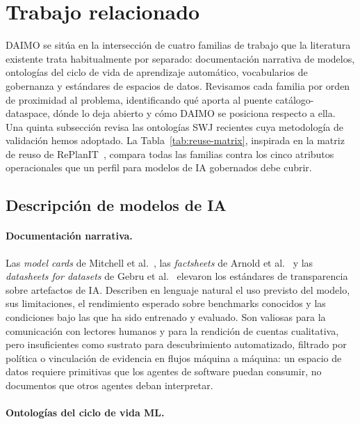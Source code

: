 \documentclass[11pt,a4paper]{article}
\begin{document}
\section{Trabajo relacionado}\label{sec:related}

DAIMO se sitúa en la intersección de cuatro familias de trabajo que la literatura existente trata habitualmente por separado: documentación narrativa de modelos, ontologías del ciclo de vida de aprendizaje automático, vocabularios de gobernanza y estándares de espacios de datos. Revisamos cada familia por orden de proximidad al problema, identificando qué aporta al puente catálogo-dataspace, dónde lo deja abierto y cómo DAIMO se posiciona respecto a ella. Una quinta subsección revisa las ontologías SWJ recientes cuya metodología de validación hemos adoptado. La Tabla~\ref{tab:reuse-matrix}, inspirada en la matriz de reuso de RePlanIT~\cite{kurteva}, compara todas las familias contra los cinco atributos operacionales que un perfil para modelos de IA gobernados debe cubrir.

\subsection{Descripción de modelos de IA}

\paragraph{Documentación narrativa.}

Las \emph{model cards} de Mitchell et al.~\cite{mitchell19}, las \emph{factsheets} de Arnold et al.~\cite{arnold19} y las \emph{datasheets for datasets} de Gebru et al.~\cite{gebru21} elevaron los estándares de transparencia sobre artefactos de IA. Describen en lenguaje natural el uso previsto del modelo, sus limitaciones, el rendimiento esperado sobre benchmarks conocidos y las condiciones bajo las que ha sido entrenado y evaluado. Son valiosas para la comunicación con lectores humanos y para la rendición de cuentas cualitativa, pero insuficientes como sustrato para descubrimiento automatizado, filtrado por política o vinculación de evidencia en flujos máquina a máquina: un espacio de datos requiere primitivas que los agentes de software puedan consumir, no documentos que otros agentes deban interpretar.

\paragraph{Ontologías del ciclo de vida ML.}
\end{document}
